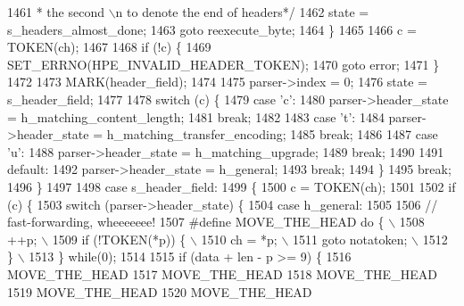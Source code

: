 \begin{DoxyCode}
1461 \textcolor{comment}{           * the second \(\backslash\)n to denote the end of headers*/}
1462           state = s_headers_almost_done;
1463           \textcolor{keywordflow}{goto} reexecute\_byte;
1464         \}
1465 
1466         c = TOKEN(ch);
1467 
1468         \textcolor{keywordflow}{if} (!c) \{
1469           SET_ERRNO(HPE_INVALID_HEADER_TOKEN);
1470           \textcolor{keywordflow}{goto} error;
1471         \}
1472 
1473         MARK(header\_field);
1474 
1475         parser->index = 0;
1476         state = s_header_field;
1477 
1478         \textcolor{keywordflow}{switch} (c) \{
1479           \textcolor{keywordflow}{case} \textcolor{charliteral}{'c'}:
1480             parser->header_state = h_matching_content_length;
1481             \textcolor{keywordflow}{break};
1482 
1483           \textcolor{keywordflow}{case} \textcolor{charliteral}{'t'}:
1484             parser->header_state = h_matching_transfer_encoding;
1485             \textcolor{keywordflow}{break};
1486 
1487           \textcolor{keywordflow}{case} \textcolor{charliteral}{'u'}:
1488             parser->header_state = h_matching_upgrade;
1489             \textcolor{keywordflow}{break};
1490 
1491           \textcolor{keywordflow}{default}:
1492             parser->header_state = h_general;
1493             \textcolor{keywordflow}{break};
1494         \}
1495         \textcolor{keywordflow}{break};
1496       \}
1497 
1498       \textcolor{keywordflow}{case} s_header_field:
1499       \{
1500         c = TOKEN(ch);
1501 
1502         \textcolor{keywordflow}{if} (c) \{
1503           \textcolor{keywordflow}{switch} (parser->header_state) \{
1504             \textcolor{keywordflow}{case} h_general:
1505 
1506               \textcolor{comment}{// fast-forwarding, wheeeeeee!}
1507 \textcolor{preprocessor}{              #define MOVE\_THE\_HEAD do \{ \(\backslash\)}
1508 \textcolor{preprocessor}{                ++p;                     \(\backslash\)}
1509 \textcolor{preprocessor}{                if (!TOKEN(*p)) \{        \(\backslash\)}
1510 \textcolor{preprocessor}{                  ch = *p;               \(\backslash\)}
1511 \textcolor{preprocessor}{                  goto notatoken;        \(\backslash\)}
1512 \textcolor{preprocessor}{                \}                        \(\backslash\)}
1513 \textcolor{preprocessor}{              \} while(0);}
1514 
1515               \textcolor{keywordflow}{if} (data + len - p >= 9) \{
1516                 MOVE_THE_HEAD
1517                 MOVE_THE_HEAD
1518                 MOVE_THE_HEAD
1519                 MOVE_THE_HEAD
1520                 MOVE_THE_HEAD

\end{DoxyCode}
